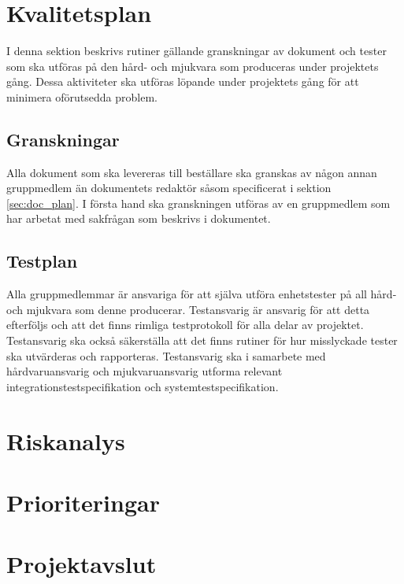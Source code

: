\documentclass[a4paper,11pt]{article}
\begin{document}
\section{Kvalitetsplan}
I denna sektion beskrivs rutiner gällande granskningar av dokument och tester som ska utföras på den hård- och mjukvara som produceras under projektets gång. Dessa aktiviteter ska utföras löpande under projektets gång för att minimera oförutsedda problem.

\subsection{Granskningar}
Alla dokument som ska levereras till beställare ska granskas av någon annan gruppmedlem än dokumentets redaktör såsom specificerat i sektion \ref{sec:doc_plan}. I första hand ska granskningen utföras av en gruppmedlem som har arbetat med sakfrågan som beskrivs i dokumentet.

\subsection{Testplan}
Alla gruppmedlemmar är ansvariga för att själva utföra enhetstester på all hård- och mjukvara som denne producerar. Testansvarig är ansvarig för att detta efterföljs och att det finns rimliga testprotokoll för alla delar av projektet. Testansvarig ska också säkerställa att det finns rutiner för hur misslyckade tester ska utvärderas och rapporteras. Testansvarig ska i samarbete med hårdvaruansvarig och mjukvaruansvarig utforma relevant integrationstestspecifikation och systemtestspecifikation.

\section{Riskanalys}

\section{Prioriteringar}

\section{Projektavslut}

\begin{appendices}
\end{appendices}
\clearpage
{}	%
\printbibliography
\end{document}
